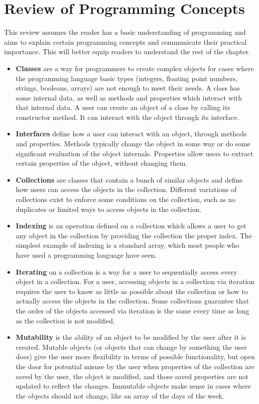 \section{Review of Programming Concepts}

This review assumes the reader has a basic understanding of programming and aims to explain certain programming concepts and communicate their practical importance. This will better equip readers to understand the rest of the chapter.

\begin{itemize}
    \item \textbf{Classes} are a way for programmers to create complex objects for cases where the programming language basic types (integers, floating point numbers, strings, booleans, arrays) are not enough to meet their needs. A class has some internal data, as well as methods and properties which interact with that internal data. A user can create an object of a class by calling its constructor method. It can interact with the object through its interface.
    \item \textbf{Interfaces} define how a user can interact with an object, through methods and properties. Methods typically change the object in some way or do some significant evaluation of the object internals. Properties allow users to extract certain properties of the object, without changing them.
    \item \textbf{Collections} are classes that contain a bunch of similar objects and define how users can access the objects in the collection. Different variations of collections exist to enforce some conditions on the collection, such as no duplicates or limited ways to access objects in the collection.
    \item \textbf{Indexing} is an operation defined on a collection which allows a user to get any object in the collection by providing the collection the proper index. The simplest example of indexing is a standard array, which most people who have used a programming language have seen.
    \item \textbf{Iterating} on a collection is a way for a user to sequentially access every object in a collection. For a user, accessing objects in a collection via iteration requires the user to know as little as possible about the collection or how to actually access the objects in the collection. Some collections guarantee that the order of the objects accessed via iteration is the same every time as long as the collection is not modified. 
    \item \textbf{Mutability} is the ability of an object to be modified by the user after it is created. Mutable objects (or objects that can change by something the user does) give the user more flexibility in terms of possible functionality, but open the door for potential misuse by the user when properties of the collection are saved by the user, the object is modified, and those saved properties are not updated to reflect the changes. Immutable objects make sense in cases where the objects should not change, like an array of the days of the week.

\end{itemize}
